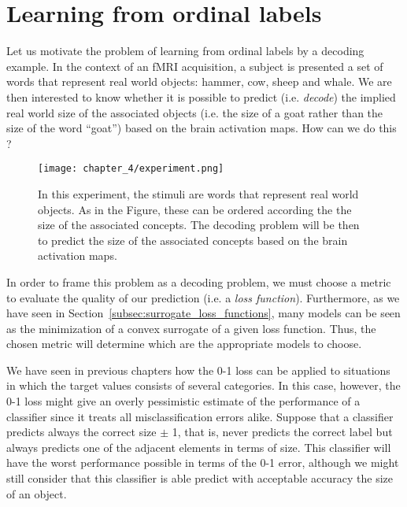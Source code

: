\newpage 
\vspace*{\fill}
\minitoc
\vspace*{\fill}
\newpage

%

\section{Learning from ordinal labels}

Let us motivate the problem of learning from ordinal labels by a decoding example. In the context of an fMRI acquisition, a subject is presented a set of words that represent real world objects:
hammer, cow, sheep and whale. We are then interested to know whether it is possible to predict (i.e. \emph{decode}) the implied real world size of the associated objects (i.e. the size of a goat rather than the size of the word ``goat'') based on the brain activation maps. How can we do this ?


\begin{figure}
\texttt{[image: chapter\_4/experiment.png]}
\caption{In this experiment, the stimuli are words that represent real world objects. As in the Figure, these can be ordered according the the size of the associated concepts. The decoding problem will be then to predict the size of the associated concepts based on the brain activation maps.}
\end{figure}



In order to frame this problem as a \gls{decoding} problem, we must choose a metric to evaluate the quality of our prediction (i.e. a \emph{loss function}). Furthermore, as we have seen in Section~\ref{subsec:surrogate_loss_functions}, many models can be seen as the minimization of a convex surrogate of a given loss function. Thus, the chosen metric will determine which are the appropriate models to choose.



We have seen in previous chapters how the 0-1 loss can be applied to situations in which the target values consists of several categories. In this case, however, the 0-1 loss might give an overly pessimistic estimate of the performance of a classifier since it treats all misclassification errors alike. Suppose that a classifier predicts always the correct size $\pm$ 1, that is, never predicts the correct label but always predicts one of the adjacent elements in terms of size. This classifier will have the worst performance possible in terms of the 0-1 error, although we might still consider that this classifier is able predict with acceptable accuracy the size of an object.


